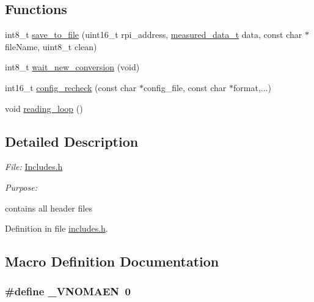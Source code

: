 \subsection*{Functions}
\begin{DoxyCompactItemize}
\item 
int8\-\_\-t \hyperlink{a00003_ga9e259879c5d746107c4a70fe08aba924}{save\-\_\-to\-\_\-file} (uint16\-\_\-t rpi\-\_\-address, \hyperlink{a00029}{measured\-\_\-data\-\_\-t} data, const char $\ast$file\-Name, uint8\-\_\-t clean)
\begin{DoxyCompactList}\small\item\em 

 \end{DoxyCompactList}\item 
int8\-\_\-t \hyperlink{a00003_ga7b6d584350762c53419945480d6958d3}{wait\-\_\-new\-\_\-conversion} (void)
\begin{DoxyCompactList}\small\item\em 

 \end{DoxyCompactList}\item 
int16\-\_\-t \hyperlink{a00003_gac93e16d1e9d6a04b52373bf3428cc79c}{config\-\_\-recheck} (const char $\ast$config\-\_\-file, const char $\ast$format,...)
\begin{DoxyCompactList}\small\item\em 

 \end{DoxyCompactList}\item 
void \hyperlink{a00003_gaeb3af492d3421787fcbb2cd1bbbaf62c}{reading\-\_\-loop} ()
\begin{DoxyCompactList}\small\item\em 

 \end{DoxyCompactList}\end{DoxyCompactItemize}


\subsection{Detailed Description}
{\itshape File\-:} \hyperlink{a00037}{Includes.\-h} \par
 {\itshape Purpose\-:} \par
 contains all header files 

Definition in file \hyperlink{a00037_source}{includes.\-h}.



\subsection{Macro Definition Documentation}
\hypertarget{a00037_ae22ff0891c8b944bf1b99b2332f16d15}{
\subsubsection[{\-\_\-\-V\-N\-O\-M\-A\-E\-N}]{\setlength{\rightskip}{0pt plus 5cm}\#define \-\_\-\-V\-N\-O\-M\-A\-E\-N~0}}\label{d1/dc6/a00037_ae22ff0891c8b944bf1b99b2332f16d15}


